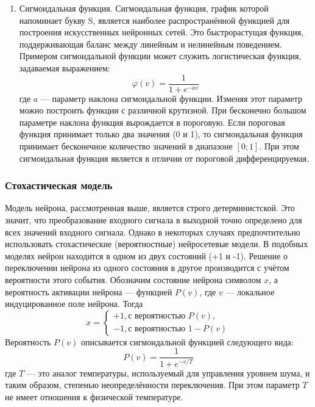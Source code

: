 \begin{enumerate}
\begin{itemize}
\end{itemize}
\item Сигмоидальная функция. 
Сигмоидальная функция, график которой напоминает букву S, является наиболее распространённой функцией для построения искусственных нейронных сетей.
Это быстрорастущая функция, поддерживающая баланс между линейным и нелинейным поведением.
Примером сигмоидальной функции может служить логистическая функция, задаваемая выражением:
\begin{equation}
\varphi(v) = \frac1{1+e^{-av}}
\end{equation}
где $a$ --- параметр наклона сигмоидальной функции.
Изменяя этот параметр можно построить функции с различной крутизной.
При бесконечно большом параметре наклона функция вырождается в пороговую.
Если пороговая функция принимает только два значения (0 и 1), то сигмоидальная функция принимает бесконечное количество значений в диапазоне $[0;1]$.
При этом сигмоидальная функция является в отличии от пороговой дифференцируемая.\cite{NejronnyeSeti}
\end{enumerate}
\subsubsection{Стохастическая модель}
Модель нейрона, рассмотренная выше, является строго детерминистской.
Это значит, что преобразование входного сигнала в выходной точно определено для всех значений входного сигнала.
Однако в некоторых случаях предпочтительно использовать стохастические (вероятностные) нейросетевые модели.
В подобных моделях нейрон находится в одном из двух состояний (+1 и -1).
Решение о переключении нейрона из одного состояния в другое производится с учётом вероятности этого события.
Обозначим состояние нейрона символом $x$, а вероятность активации нейрона --- функцией $P(v)$, где $v$ --- локальное индуцированное поле нейрона.
Тогда
\begin{equation}
x=
\begin{cases}
+1, \text{с вероятностью } P(v),\\
-1, \text{с вероятностью } 1-P(v)
\end{cases}
\end{equation}
Вероятность $P(v)$ описывается сигмоидальной функцией следующего вида:
\begin{equation}
P(v) = \frac1{1 + e^{- v/T}}
\end{equation}
где $T$ --- это аналог температуры, используемый для управления уровнем шума, и таким образом, степенью неопределённости переключения.
При этом параметр $T$ не имеет отношения к физической температуре. \cite{NejronnyeSeti}
